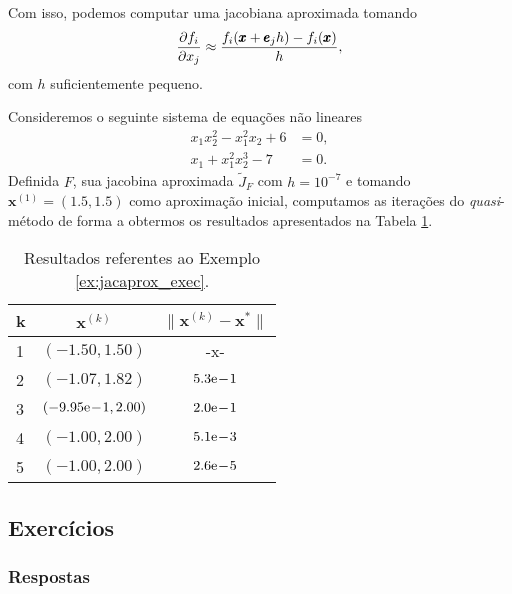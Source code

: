 Com isso, podemos computar uma jacobiana aproximada tomando
\begin{equation}
  \frac{\partial f_i}{\partial x_j} \approx \frac{f_i(\pmb{x}+\pmb{e}_jh) - f_i(\pmb{x})}{h},
\end{equation}
com $h$ suficientemente pequeno.

\begin{ex}\label{ex:jacaprox_exec}
  Consideremos o seguinte sistema de equações não lineares
  \begin{align}
    x_1x_2^2 - x_1^2x_2 + 6 &= 0,\\
    x_1 + x_1^2x_2^3 - 7 &= 0.
  \end{align}
  Definida $F$, sua jacobina aproximada $\tilde{J}_F$ com $h=10^{-7}$ e tomando $\pmb{x}^{(1)} = (1.5, 1.5)$ como aproximação inicial, computamos as iterações do {\it quasi}-método de forma a obtermos os resultados apresentados na Tabela \ref{tab:ex_jacaprox_exec}.

  \begin{table}[h!]
    \centering
    \begin{tabular}{lcc}
      k & $\pmb{x}^{(k)}$ & $\|\pmb{x}^{(k)} - \pmb{x}^*\|$\\\hline
      1 & $(-1.50, 1.50)$ & -x- \\
      2 & $(-1.07, 1.82)$ & $5.3\mathrm{e}\!-\!1$\\
      3 & $(-9.95\mathrm{e}\!-\!1, 2.00)$ & $2.0\mathrm{e}\!-\!1$\\
      4 & $(-1.00, 2.00)$ & $5.1\mathrm{e}\!-\!3$\\
      5 & $(-1.00, 2.00)$ & $2.6\mathrm{e}\!-\!5$\\\hline
    \end{tabular}
    \caption{Resultados referentes ao Exemplo \ref{ex:jacaprox_exec}.}
    \label{tab:ex_jacaprox_exec}
  \end{table}

% 
\end{ex}

\subsection{Exercícios}

\badgeConstrucao

\ifisbook
\subsubsection{Respostas}
\shipoutAnswer
\fi

